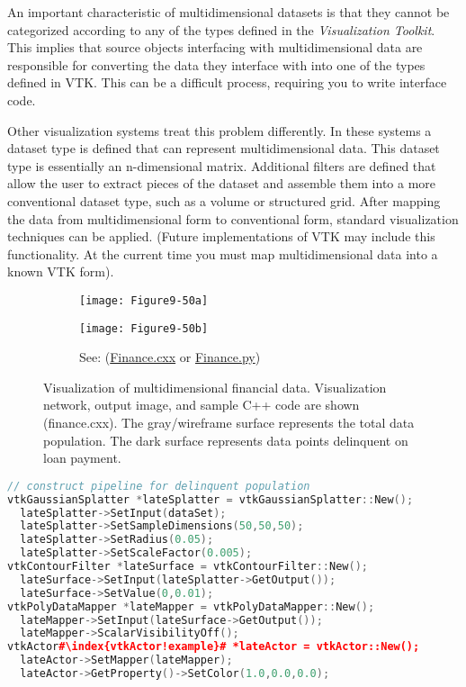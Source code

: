 An important characteristic of multidimensional datasets is that they cannot be categorized according to any of the types defined in the \emph{Visualization Toolkit}. This implies that source objects interfacing with multidimensional data are responsible for converting the data they interface with into one of the types defined in VTK. This can be a difficult process, requiring you to write interface code.

Other visualization systems treat this problem differently. In these systems a dataset type is defined that can represent multidimensional data. This dataset type is essentially an n-dimensional matrix. Additional filters are defined that allow the user to extract pieces of the dataset and assemble them into a more conventional dataset type, such as a volume or structured grid. After mapping the data from multidimensional form to conventional form, standard visualization techniques can be applied. (Future implementations of VTK may include this functionality. At the current time you must map multidimensional data into a known VTK form).

\begin{figure}[htb]
    \centering
	\begin{subfigure}[h]{0.48\linewidth}
		\texttt{[image: Figure9-50a]}
		\captionsetup{justification=centering}
		\caption*{}
		\label{fig:Figure9-50a}
	\end{subfigure}
	\hfill
	\begin{subfigure}[h]{0.48\linewidth}
		\texttt{[image: Figure9-50b]}
		\captionsetup{justification=centering}
		\caption*{See: (\href{https://lorensen.github.io/VTKExamples/site/Cxx/Modelling/Finance/}{Finance.cxx} or \href{https://lorensen.github.io/VTKExamples/site/Python/Modelling/Finance/}{Finance.py})}
	\end{subfigure}
	\caption{Visualization of multidimensional financial data. Visualization network, output image, and sample C++ code are shown (finance.cxx). The gray/wireframe surface represents the total data population. The dark surface represents data points delinquent on loan payment.}\label{fig:Figure9-50}
\end{figure}

\begin{lstlisting}[language=C++, caption={Visualizing multidimensional data.}, escapechar=\#]
// construct pipeline for delinquent population
vtkGaussianSplatter *lateSplatter = vtkGaussianSplatter::New();
  lateSplatter->SetInput(dataSet);
  lateSplatter->SetSampleDimensions(50,50,50);
  lateSplatter->SetRadius(0.05);
  lateSplatter->SetScaleFactor(0.005);
vtkContourFilter *lateSurface = vtkContourFilter::New();
  lateSurface->SetInput(lateSplatter->GetOutput());
  lateSurface->SetValue(0,0.01);
vtkPolyDataMapper *lateMapper = vtkPolyDataMapper::New();
  lateMapper->SetInput(lateSurface->GetOutput());
  lateMapper->ScalarVisibilityOff();
vtkActor#\index{vtkActor!example}# *lateActor = vtkActor::New();
  lateActor->SetMapper(lateMapper);
  lateActor->GetProperty()->SetColor(1.0,0.0,0.0);
\end{lstlisting}

